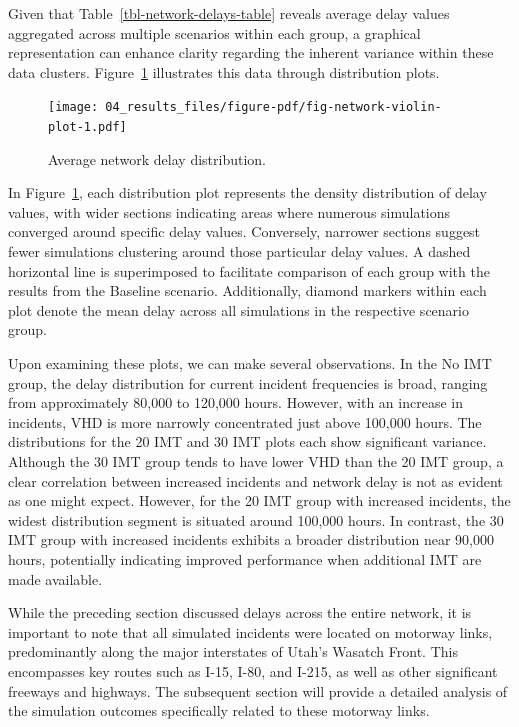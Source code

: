 \documentclass[fancy, oneside, mastersfancy, ms]{byuthesis}
\begin{document}
Given that Table~\ref{tbl-network-delays-table} reveals average delay
values aggregated across multiple scenarios within each group, a
graphical representation can enhance clarity regarding the inherent
variance within these data clusters.
Figure~\ref{fig-network-violin-plot} illustrates this data through
distribution plots.

\begin{figure}

{\centering \texttt{[image: 04\_results\_files/figure-pdf/fig-network-violin-plot-1.pdf]}

}

\caption{\label{fig-network-violin-plot}Average network delay
distribution.}

\end{figure}

In Figure~\ref{fig-network-violin-plot}, each distribution plot
represents the density distribution of delay values, with wider sections
indicating areas where numerous simulations converged around specific
delay values. Conversely, narrower sections suggest fewer simulations
clustering around those particular delay values. A dashed horizontal
line is superimposed to facilitate comparison of each group with the
results from the Baseline scenario. Additionally, diamond markers within
each plot denote the mean delay across all simulations in the respective
scenario group.

Upon examining these plots, we can make several observations. In the No
IMT group, the delay distribution for current incident frequencies is
broad, ranging from approximately 80,000 to 120,000 hours. However, with
an increase in incidents, VHD is more narrowly concentrated just above
100,000 hours. The distributions for the 20 IMT and 30 IMT plots each
show significant variance. Although the 30 IMT group tends to have lower
VHD than the 20 IMT group, a clear correlation between increased
incidents and network delay is not as evident as one might expect.
However, for the 20 IMT group with increased incidents, the widest
distribution segment is situated around 100,000 hours. In contrast, the
30 IMT group with increased incidents exhibits a broader distribution
near 90,000 hours, potentially indicating improved performance when
additional IMT are made available.

While the preceding section discussed delays across the entire network,
it is important to note that all simulated incidents were located on
motorway links, predominantly along the major interstates of Utah's
Wasatch Front. This encompasses key routes such as I-15, I-80, and
I-215, as well as other significant freeways and highways. The
subsequent section will provide a detailed analysis of the simulation
outcomes specifically related to these motorway links.
\end{document}
